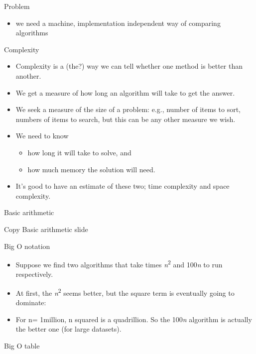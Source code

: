 \documentclass{beamer}
\begin{document}
\begin{frame}

Problem

\begin{itemize}
\item we need a machine, implementation independent way of comparing algorithms
\end{itemize}

\end{frame} \begin{frame}

Complexity

\begin{itemize}
\item Complexity is a (the?) way we can tell whether one method is better than another.
\item We get a measure of how long an algorithm will take to get the answer.
\item We seek a measure of the size of a problem: e.g., number of items to sort, numbers of items to search, but this
can be any other measure we wish.
\item We need to know

\begin{itemize}
\item how long it will take to solve, and
\item how much memory the solution will need.
\end{itemize}
\item It's good to have an estimate of these two; time complexity and space complexity.
\end{itemize}

\end{frame} \begin{frame}

Basic arithmetic

Copy Basic arithmetic slide

\end{frame} \begin{frame}

Big O notation

\begin{itemize}
\item Suppose we find two algorithms that take times \textit{n}\textsuperscript{2 }and 100\textit{n }to run
respectively.
\item At first, the \textit{n}\textsuperscript{2 }seems better, but the square term is eventually going to dominate:
\item For n= 1million, n squared is a quadrillion. So the 100\textit{n }algorithm is actually the better one (for large
datasets).
\end{itemize}
Big O table

\end{frame} 
\end{document}
